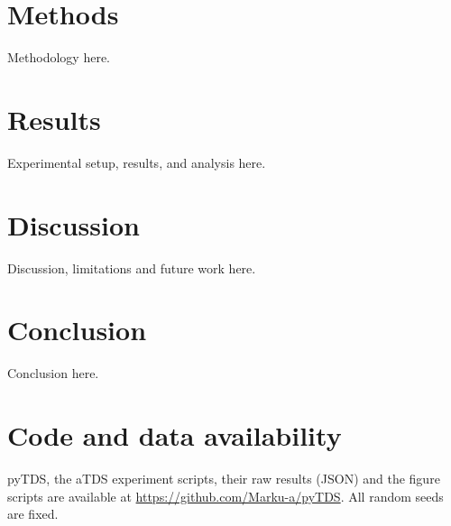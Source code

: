\documentclass[11pt,a4paper]{article}
\begin{document}
\section{Methods}
\label{sec:method}
Methodology here.

\section{Results}
\label{sec:experiments}
Experimental setup, results, and analysis here.

\section{Discussion}
\label{sec:discussion}
Discussion, limitations and future work here.

\section{Conclusion}
\label{sec:conclusion}
Conclusion here.

\section*{Code and data availability}
pyTDS, the aTDS experiment scripts, their raw results (JSON) and the figure scripts are available at \url{https://github.com/Marku-a/pyTDS}. All random seeds are fixed.




\end{document}
